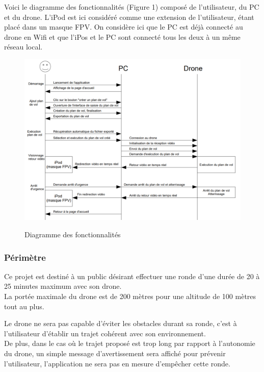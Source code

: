 \documentclass{article}
\begin{document}
     \newpage
	    Voici le diagramme des fonctionnalités (Figure 1) composé de l'utilisateur, du PC et du drone. L'iPod est ici considéré comme une extension de l'utilisateur, étant placé dans un masque FPV. On considère ici que le PC est déjà connecté au drone en Wifi et que l'iPos et le PC sont connecté tous les deux à un même réseau local.\\
	    
		\begin{center}
		\begin{figure}[!h]
		\includegraphics[scale=0.7]{corrige_diagramme_services.PNG}\\
		 \vspace*{0.3cm}
		\caption{Diagramme des fonctionnalités}
		\end{figure}
		\end{center}
		
			
\subsubsection{Périmètre}
		Ce projet est destiné à un public désirant effectuer une ronde d'une durée de 20 à 25 minutes maximum avec son drone.\\
		La portée maximale du drone est de 200 mètres pour une altitude de 100 mètres tout au plus.
	
		Le drone ne sera pas capable d'éviter les obstacles durant sa ronde, c'est à l'utilisateur d'établir un trajet cohérent avec son environnement.\\
		De plus, dans le cas où le trajet proposé est trop long par rapport à l'autonomie du drone, un simple message d'avertissement sera affiché pour prévenir l'utilisateur, l'application ne sera pas en mesure d'empêcher cette ronde.
	
\end{document}
